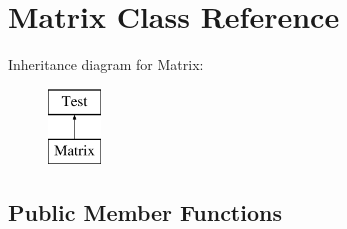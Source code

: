 \hypertarget{class_matrix}{}\section{Matrix Class Reference}
\label{class_matrix}
Inheritance diagram for Matrix\+:\begin{figure}[H]
\begin{center}
\leavevmode
\includegraphics[height=2.000000cm]{class_matrix}
\end{center}
\end{figure}
\subsection*{Public Member Functions}
